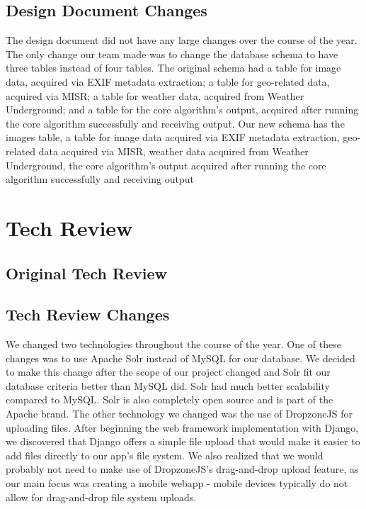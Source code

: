 \documentclass[onecolumn, draftclsnofoot,10pt, compsoc]{IEEEtran}
\begin{document}
\begin{flushleft}
\subsection{Design Document Changes} 
The design document did not have any large changes over the course of the year. The only change our team made was to change the database schema to have three tables instead of four tables. The original schema had a table for image data, acquired via EXIF metadata extraction; a table for geo-related data, acquired via MISR; a table for weather data, acquired from Weather Underground; and a table for the core algorithm's output, acquired after running the core algorithm successfully and receiving output. Our new schema has the images table, a table for image data acquired via EXIF metadata extraction, geo-related data acquired via MISR, weather data acquired from Weather Underground, the core algorithm's output acquired after running the core algorithm successfully and receiving output
 
\section{Tech Review}
\subsection{Original Tech Review}

 
\subsection{Tech Review Changes} 
We changed two technologies throughout the course of the year. One of these changes was to use Apache Solr instead of MySQL for our database. We decided to make this change after the scope of our project changed and Solr fit our database criteria better than MySQL did. Solr had much better scalability compared to MySQL. Solr is also completely open source and is part of the Apache brand. The other technology we changed was the use of DropzoneJS for uploading files. After beginning the web framework implementation with Django, we discovered that Django offers a simple file upload that would make it easier to add files directly to our app's file system. We also realized that we would probably not need to make use of DropzoneJS's drag-and-drop upload feature, as our main focus was creating a mobile webapp - mobile devices typically do not allow for drag-and-drop file system uploads.
 

\end{flushleft}
\end{document}
